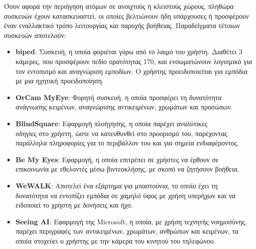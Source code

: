 Όσον αφορά την περιήγηση ατόμων σε ανοιχτούς ή κλειστούς χώρους, πληθώρα συσκευών έχουν κατασκευαστεί, οι οποίες βελτιώνουν ήδη υπάρχουσες ή προσφέρουν έναν εναλλακτικό τρόπο λειτουργίας και παροχής βοήθειας. Παραδείγματα τέτοιων συσκευών αποτελούν:
\begin{itemize}
  \item \textbf{biped}: Συσκευή, η οποία φοριέται γύρω από το λαιμό του χρήστη. Διαθέτει 3 κάμερες, που προσφέρουν πεδίο ορατότητας 170\textdegree, και ενσωματώνουν λογισμικό για τον εντοπισμό και αναγνώριση εμποδίων. Ο χρήστης προειδοποιείται για εμπόδια με μια ηχητική προειδοποίηση.~\cite{biped}
  \item \textbf{OrCam MyEye}: Φορητή συσκευή, η οποία προσφέρει τη δυνατότητα ανάγνωσης κειμένων, αναγνώρισης αντικειμένων, χρωμάτων και προσώπων.~\cite{ghebali_2023_orcam}
  \item \textbf{BlindSquare}: Εφαρμογή πλοήγησης, η οποία παρέχει αναλύτικες\\οδηγίες στο χρήστη, ώστε να κατευθυνθεί στο προορισμό του, παρέχοντας παράλληλα πληροφορίες για το περιβάλλον του και για σημεία ενδιαφέροντος.~\cite{blindsquare}
  \item \textbf{Be My Eyes}: Εφαρμογή, η οποία επιτρέπει σε χρήστες να έρθουν σε επικοινωνία με εθελοντές μέσω βιντεοκλήσης, με σκοπό να ζητήσουν βοήθεια.~\cite{a2019_be}
  \item \textbf{WeWALK}: Αποτελεί ένα εξάρτημα για μπαστούνια, το οποίο έχει τη δυνατότητα να εντοπίζει εμπόδια σε χαμηλό ύψος με χρήση υπερήχων και να ειδοποιεί το χρήστη με δονήσεις και ήχο.~\cite{wewalk}
  \item \textbf{Seeing AI}: Εφαρμογή της Microsoft, η οποία, με χρήση τεχνητής νοημοσύνης, παρέχει περιγραφές των αντικειμένων, χρωμάτων, ανθρώπων και κειμένων, τα οποία στοχεύει ο χρήστης με την κάμερα του κινητού του τηλεφώνου.~\cite{seeing}
\end{itemize}